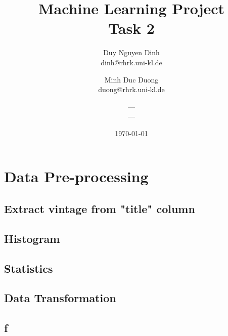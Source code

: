 \documentclass[11pt]{article}
\title{Machine Learning Project\\Task 2}
\author{Duy Nguyen Dinh \\ dinh@rhrk.uni-kl.de\and
	Minh Duc Duong\\ duong@rhrk.uni-kl.de\and
    ---\\ ---}
\date{\today}
\begin{document}
\maketitle

\section{Data Pre-processing}

\subsection{Extract vintage from "title" column}
\subsection{Histogram}
\subsection{Statistics}
\subsection{Data Transformation}
\subsection{f}



\end{document}
